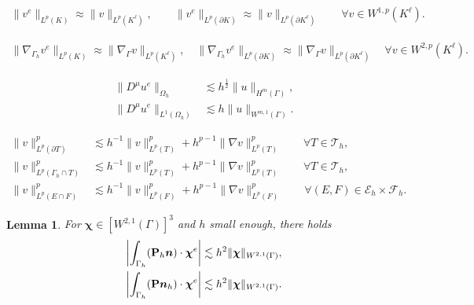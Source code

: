 \documentclass[10pt,a4paper]{amsart}
\newtheorem{lemma}{Lemma}
\newcommand{\bchi}{{\bm \chi}}
\newcommand{\bn}{{\bm n}}
\newcommand{\calE}{\mathcal{E}}
\newcommand{\calF}{\mathcal{F}}
\newcommand{\calT}{\mathcal{T}}
\newcommand{\nab}{\nabla}
\newcommand{\p}{\partial}
\begin{document}
\begin{align}
\|v^e\|_{L^p(K)} \approx \|v\|_{L^p(K^\ell)}, \qquad \|v^e\|_{L^p(\p K)}\approx \|v\|_{L^p(\p K^\ell)} \qquad \forall v\in W^{1,p}(K^\ell). \label{250921-1}
\end{align}

\begin{align}
        \label{eqn:GradEquivBound}
\|\nab_{\Gamma_h} v^e\|_{L^p(K)}\approx \|\nab_\Gamma v\|_{L^p(K^\ell)},\quad
\|\nab_{\Gamma_h} v^e\|_{L^p(\p K)}\approx \|\nab_\Gamma v\|_{L^p(\p K^\ell)}\quad
\forall v\in W^{2,p}(K^\ell).
\end{align}

\begin{align}
\|D^\mu u^e\|_{\Omega_h}
& \lesssim h^{\frac{1}{2}}\|u\|_{H^m(\Gamma)}, \label{*} \\
\|D^\mu u^e\|_{L^1(\Omega_h)}
& \lesssim h\|u\|_{W^{m, 1}(\Gamma)}. \label{250728-1}
\end{align}

\begin{align}
\|v\|_{L^p(\partial T)}^p
& \lesssim h^{-1}\|v\|_{L^p(T)}^p + h^{p-1}\|\nab v\|_{L^p(T)}^p \qquad \forall T \in \calT_h, \label{trace-inequ-1} \\
\|v\|_{L^p(\Gamma_h \cap T)}^p
& \lesssim h^{-1}\|v\|_{L^p(T)}^p+ h^{p-1}\|\nab v\|_{L^p(T)}^p \qquad \forall T \in \calT_h, \label{trace-inequ-2} \\
\|v\|_{L^p(E \cap F)}^p
& \lesssim h^{-1}\|v\|_{L^p(F)}^p + h^{p-1}\|\nab v\|_{L^p(F)}^p \qquad \forall (E,F) \in \calE_h \times \calF_h. 
 \label{trace-inequ-3}
\end{align}

\begin{lemma}\label{lem:Phbn}%
For $\bchi \in [W^{2, 1}(\Gamma)]^3$ and $h$ small enough, there holds
\begin{align}
\left|\int_{\Gamma_h}({\bf P}_h\bn) \cdot \bchi^e\right|
& \lesssim h^2\|\bchi\|_{W^{2, 1}(\Gamma)}, \label{250728-2} \\
\left|\int_{\Gamma_h}({\bf P}\bn_h) \cdot \bchi^e\right|
& \lesssim h^2\|\bchi\|_{W^{2, 1}(\Gamma)}. \label{250909-2}
\end{align}
\end{lemma}
\end{document}
